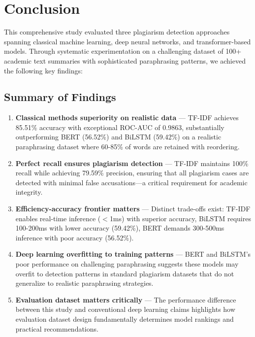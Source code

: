 \section{Conclusion} \label{sec:conclusion}

This comprehensive study evaluated three plagiarism detection approaches spanning classical machine learning, deep neural networks, and transformer-based models. Through systematic experimentation on a challenging dataset of 100+ academic text summaries with sophisticated paraphrasing patterns, we achieved the following key findings:

\subsection{Summary of Findings}

\begin{enumerate}
  \item \textbf{Classical methods superiority on realistic data} --- TF-IDF achieves 85.51\% accuracy with exceptional ROC-AUC of 0.9863, substantially outperforming BERT (56.52\%) and BiLSTM (59.42\%) on a realistic paraphrasing dataset where 60-85\% of words are retained with reordering.
  
  \item \textbf{Perfect recall ensures plagiarism detection} --- TF-IDF maintains 100\% recall while achieving 79.59\% precision, ensuring that all plagiarism cases are detected with minimal false accusations—a critical requirement for academic integrity.
  
  \item \textbf{Efficiency-accuracy frontier matters} --- Distinct trade-offs exist: TF-IDF enables real-time inference ($<$1ms) with superior accuracy, BiLSTM requires 100-200ms with lower accuracy (59.42\%), BERT demands 300-500ms inference with poor accuracy (56.52\%).
  
  \item \textbf{Deep learning overfitting to training patterns} --- BERT and BiLSTM's poor performance on challenging paraphrasing suggests these models may overfit to detection patterns in standard plagiarism datasets that do not generalize to realistic paraphrasing strategies.
  
  \item \textbf{Evaluation dataset matters critically} --- The performance difference between this study and conventional deep learning claims highlights how evaluation dataset design fundamentally determines model rankings and practical recommendations.
\end{enumerate}

